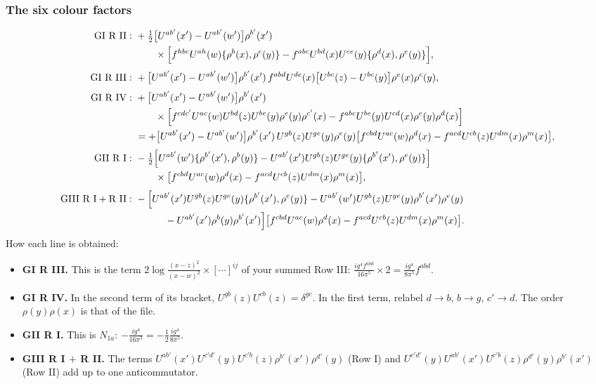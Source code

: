 \documentclass[9pt]{article}
\numberwithin{equation}{section}
\begin{document}
\subsubsection*{The six colour factors}
\begin{align}
\text{GI R II}:\ &+\tfrac12\big[U^{ab'}(x')-U^{ab'}(w')\big]\rho^{b'}(x')\notag\\&\qquad\times\Big[f^{hbc}U^{ah}(w)\{\rho^{b}(x),\rho^{c}(y)\}-f^{abc}U^{bd}(x)U^{ce}(y)\{\rho^{d}(x),\rho^{e}(y)\}\Big],\notag\\[3pt]
\text{GI R III}:\ &+\big[U^{ab'}(x')-U^{ab'}(w')\big]\rho^{b'}(x')\,f^{abd}U^{de}(x)\big[U^{bc}(z)-U^{bc}(y)\big]\rho^{e}(x)\rho^{c}(y),\notag\\[3pt]
\text{GI R IV}:\ &+\big[U^{ab'}(x')-U^{ab'}(w')\big]\rho^{b'}(x')\notag\\&\qquad\times\Big[f^{cdc'}U^{ac}(w)U^{bd}(z)U^{be}(y)\rho^{e}(y)\rho^{c'}(x)-f^{abc}U^{be}(y)U^{cd}(x)\rho^{e}(y)\rho^{d}(x)\Big]\notag\\
&=+\big[U^{ab'}(x')-U^{ab'}(w')\big]\rho^{b'}(x')\,U^{gb}(z)U^{ge}(y)\rho^{e}(y)\big[f^{cbd}U^{ac}(w)\rho^{d}(x)-f^{acd}U^{cb}(z)U^{dm}(x)\rho^{m}(x)\big],\notag\\[3pt]
\text{GII R I}:\ &-\tfrac12\Big[U^{ab'}(w')\{\rho^{b'}(x'),\rho^{b}(y)\}-U^{ab'}(x')U^{gb}(z)U^{ge}(y)\{\rho^{b'}(x'),\rho^{e}(y)\}\Big]\notag\\&\qquad\times\big[f^{cbd}U^{ac}(w)\rho^{d}(x)-f^{acd}U^{cb}(z)U^{dm}(x)\rho^{m}(x)\big],\notag\\[3pt]
\text{GIII R I}+\text{R II}:\ &-\Big[U^{ab'}(x')U^{gb}(z)U^{ge}(y)\{\rho^{b'}(x'),\rho^{e}(y)\}-U^{ab'}(w')U^{gb}(z)U^{ge}(y)\rho^{b'}(x')\rho^{e}(y)\notag\\&\qquad\quad-U^{ab'}(x')\rho^{b}(y)\rho^{b'}(x')\Big]\big[f^{cbd}U^{ac}(w)\rho^{d}(x)-f^{acd}U^{cb}(z)U^{dm}(x)\rho^{m}(x)\big].
\end{align}
How each line is obtained:
\begin{itemize}
\item \textbf{GI R III.} This is the term $2\log\frac{(x-z)^{2}}{(x-w)^{2}}\times[\cdots]^{ij}$ of your summed Row III: $\frac{ig^{4}f^{abd}}{16\pi^{5}}\times2=\frac{ig^{4}}{8\pi^{5}}f^{abd}$.
\item \textbf{GI R IV.} In the second term of its bracket, $U^{gb}(z)U^{cb}(z)=\delta^{gc}$. In the first term, relabel $d\to b$, $b\to g$, $c'\to d$. The order $\rho(y)\rho(x)$ is that of the file.
\item \textbf{GII R I.} This is $N_{1a}$: $-\frac{ig^{4}}{16\pi^{5}}=-\frac12\frac{ig^{4}}{8\pi^{5}}$.
\item \textbf{GIII R I $+$ R II.} The terms $U^{ab'}(x')U^{c'd'}(y)U^{c'b}(z)\rho^{b'}(x')\rho^{d'}(y)$ (Row I) and $U^{c'd'}(y)U^{ab'}(x')U^{c'b}(z)\rho^{d'}(y)\rho^{b'}(x')$ (Row II) add up to one anticommutator.
\end{itemize}
\end{document}
